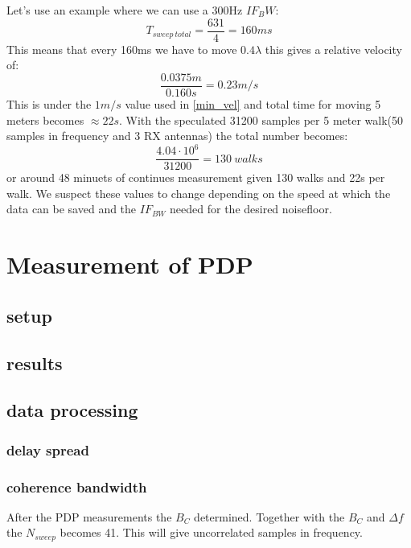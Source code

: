 Let's  use an example where we can use a 300Hz $IF_BW$:
\begin{equation}
T_{sweep \ total} = \frac{631}{4} = 160ms
\end{equation}
This means that every 160ms we have to move $0.4 \lambda$ this gives a relative velocity of:
\begin{equation}
\frac{0.0375m}{0.160s} = 0.23 m/s
\end{equation}
This is under the $1m/s$ value used in \autoref{min_vel}
and total time for moving 5 meters becomes $\approx 22s$.
With the speculated 31200 samples per 5 meter walk(50 samples in frequency and 3 RX antennas) the total number becomes:
\begin{equation}
\frac{4.04 \cdot 10^6}{31200} = 130 \ walks
\end{equation}
or around 48 minuets of continues measurement given 130 walks and 22s per walk. We suspect these values to change depending on the speed at which the data can be saved and the $IF_{BW}$ needed for the desired noisefloor.

\chapter{Measurement of PDP}
\section{setup}
\section{results}
\section{data processing}
\subsection{delay spread}

\subsection{coherence bandwidth}\label{sec:coherence_bandwidth}
After the PDP measurements the $B_C$ determined. Together with the $B_C$ and $\Delta f$ the $N_{sweep}$ becomes 41. This will give uncorrelated samples in frequency.


